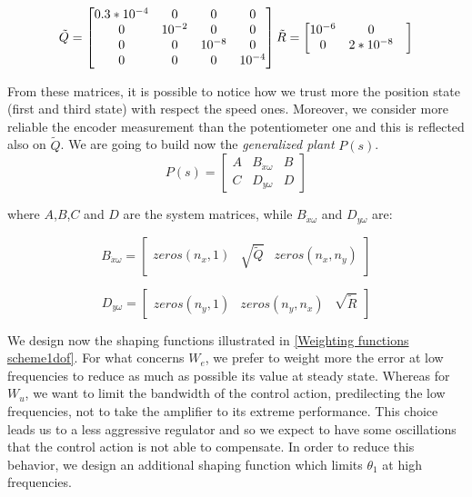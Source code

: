 \begin{equation}
	\tilde{Q}=
	\begin{bmatrix}
		0.3*10^{-4} & 0 & 0 & 0 \\
		0 & 10^{-2} & 0 & 0 \\
		0 & 0 & 10^{-8} & 0 \\
		0 & 0 & 0 & 10^{-4}
	\end{bmatrix}
	\\
	\tilde{R}=
	\begin{bmatrix}
		10^{-6} & 0\\
		0 & 2*10^{-8} & 
	\end{bmatrix}	
\end{equation}

From these matrices, it is possible to notice how we trust more the position state (first and third state) with respect the speed ones. Moreover, we consider more reliable the encoder measurement than the potentiometer one and this is reflected also on $\tilde{Q}$. 
\newline
We are going to build now the \textit{generalized plant} $P(s)$.
\begin{equation}
	P(s)
	=
	\begin{bmatrix}
		A &B_{\dot{x}\omega} & B\\
		C & D_{y\omega} & D	
	\end{bmatrix}
\label{P(s)}
\end{equation}

where $A$,$B$,$C$ and $D$ are the system matrices, while $B_{\dot{x}\omega}$ and $D_{y\omega}$ are:

\begin{equation}
	B_{\dot{x}\omega}=
	\begin{bmatrix}
		zeros(n_x,1) & \sqrt{\tilde{Q}} & zeros (n_x,n_y)
	\end{bmatrix}
\end{equation}

\begin{equation}
	D_{y\omega}=
	\begin{bmatrix}
		zeros(n_y,1) & zeros (n_y,n_x) & \sqrt{\tilde{R}}
	\end{bmatrix}
\end{equation}

We design now the shaping functions illustrated in \ref{Weighting functions scheme1dof}. For what concerns $W_e$, we prefer to weight more the error at low frequencies to reduce as much as possible its value at steady state. Whereas for $W_u$, we want to limit the bandwidth of the control action, predilecting the low frequencies, not to take the amplifier to its extreme performance. This choice leads us to a less aggressive regulator and so we expect to have some oscillations that the control action is not able to compensate. In order to reduce this behavior, we design an additional shaping function which limits $\theta_{1}$ at high frequencies.

